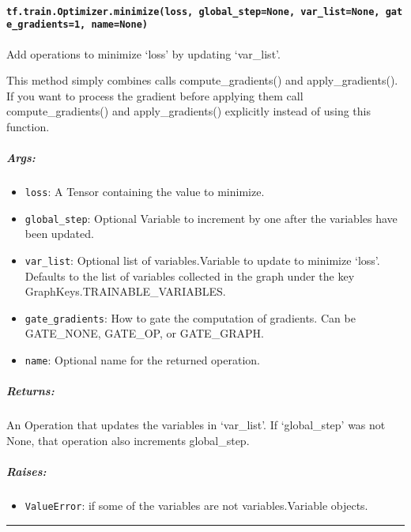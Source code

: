 \paragraph{\texorpdfstring{\texttt{tf.train.Optimizer.minimize(loss,\ global\_step=None,\ var\_list=None,\ gate\_gradients=1,\ name=None)}
}{tf.train.Optimizer.minimize(loss, global\_step=None, var\_list=None, gate\_gradients=1, name=None) }}\label{tf.train.optimizer.minimizeloss-globalux5fstepnone-varux5flistnone-gateux5fgradients1-namenone}

Add operations to minimize `loss' by updating `var\_list'.

This method simply combines calls compute\_gradients() and
apply\_gradients(). If you want to process the gradient before applying
them call compute\_gradients() and apply\_gradients() explicitly instead
of using this function.

\subparagraph{Args: }\label{args-1}

\begin{itemize}
\tightlist
\item
  \texttt{loss}: A Tensor containing the value to minimize.
\item
  \texttt{global\_step}: Optional Variable to increment by one after the
  variables have been updated.
\item
  \texttt{var\_list}: Optional list of variables.Variable to update to
  minimize `loss'. Defaults to the list of variables collected in the
  graph under the key GraphKeys.TRAINABLE\_VARIABLES.
\item
  \texttt{gate\_gradients}: How to gate the computation of gradients.
  Can be GATE\_NONE, GATE\_OP, or GATE\_GRAPH.
\item
  \texttt{name}: Optional name for the returned operation.
\end{itemize}

\subparagraph{Returns: }\label{returns}

An Operation that updates the variables in `var\_list'. If
`global\_step' was not None, that operation also increments
global\_step.

\subparagraph{Raises: }\label{raises-1}

\begin{itemize}
\tightlist
\item
  \texttt{ValueError}: if some of the variables are not
  variables.Variable objects.
\end{itemize}

\begin{center}\rule{0.5\linewidth}{\linethickness}\end{center}

